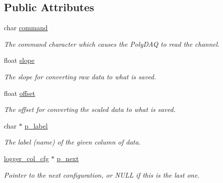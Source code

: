 \subsection*{Public Attributes}
\begin{DoxyCompactItemize}
\item 
\hypertarget{classlogger__col__cfg_a6e82dca8f3cc2f5ad53c3596f37dee25}{char \hyperlink{classlogger__col__cfg_a6e82dca8f3cc2f5ad53c3596f37dee25}{command}}\label{classlogger__col__cfg_a6e82dca8f3cc2f5ad53c3596f37dee25}

\begin{DoxyCompactList}\small\item\em The command character which causes the Poly\-D\-A\-Q to read the channel. \end{DoxyCompactList}\item 
\hypertarget{classlogger__col__cfg_ae4b90337e551749b1be1ab3a967f8a73}{float \hyperlink{classlogger__col__cfg_ae4b90337e551749b1be1ab3a967f8a73}{slope}}\label{classlogger__col__cfg_ae4b90337e551749b1be1ab3a967f8a73}

\begin{DoxyCompactList}\small\item\em The slope for converting raw data to what is saved. \end{DoxyCompactList}\item 
\hypertarget{classlogger__col__cfg_a386fa258ee9c035dcd67bebc44789899}{float \hyperlink{classlogger__col__cfg_a386fa258ee9c035dcd67bebc44789899}{offset}}\label{classlogger__col__cfg_a386fa258ee9c035dcd67bebc44789899}

\begin{DoxyCompactList}\small\item\em The offset for converting the scaled data to what is saved. \end{DoxyCompactList}\item 
\hypertarget{classlogger__col__cfg_af82115d776b995020e0afd8061fcfa5a}{char $\ast$ \hyperlink{classlogger__col__cfg_af82115d776b995020e0afd8061fcfa5a}{p\-\_\-label}}\label{classlogger__col__cfg_af82115d776b995020e0afd8061fcfa5a}

\begin{DoxyCompactList}\small\item\em The label (name) of the given column of data. \end{DoxyCompactList}\item 
\hypertarget{classlogger__col__cfg_adec0e9660a87545cefd316a0c99b9bc5}{\hyperlink{classlogger__col__cfg}{logger\-\_\-col\-\_\-cfg} $\ast$ \hyperlink{classlogger__col__cfg_adec0e9660a87545cefd316a0c99b9bc5}{p\-\_\-next}}\label{classlogger__col__cfg_adec0e9660a87545cefd316a0c99b9bc5}

\begin{DoxyCompactList}\small\item\em Pointer to the next configuration, or {\ttfamily N\-U\-L\-L} if this is the last one. \end{DoxyCompactList}\end{DoxyCompactItemize}


